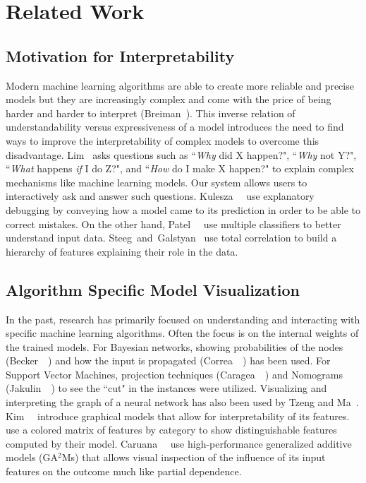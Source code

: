 
\section{Related Work}

\subsection{Motivation for Interpretability}
Modern machine learning algorithms are able to create more reliable and precise models
but they are increasingly complex and come with the price of being harder and harder to interpret (Breiman~\cite{breiman2001}).
This inverse relation of understandability versus expressiveness of a model introduces the need
to find ways to improve the interpretability of complex models to overcome this disadvantage.
Lim~\cite{Lim:2012:IUT:2518922} asks questions such as ``\emph{Why} did X happen?",
``\emph{Why} not Y?", ``\emph{What} happens \emph{if} I do Z?", and ``\emph{How} do I make X happen?"
to explain complex mechanisms like machine learning models.
Our system allows users to interactively ask and answer such questions.
Kulesza~\etal~\cite{Kulesza:2015:PED:2678025.2701399} use explanatory debugging by conveying how a model
came to its prediction in order to be able to correct mistakes.
On the other hand, Patel~\etal~\cite{DBLP:conf/ijcai/PatelDFKT11} use multiple classifiers
to better understand input data.
Steeg~and~Galstyan~\cite{NIPS2014_5580,steeg2015corex_theory} use total correlation to build
a hierarchy of features explaining their role in the data.

\subsection{Algorithm Specific Model Visualization}
In the past, research has primarily focused on understanding and interacting with specific machine learning algorithms.
Often the focus is on the internal weights of the trained models.
For Bayesian networks, showing probabilities of the nodes (Becker~\etal~\cite{Becker:2001:VSB:383784.383809}) and how the input is propagated (Correa~\etal~\cite{DBLP:journals/isci/MartinsONHC13})
has been used.
For Support Vector Machines,
projection techniques (Caragea~\etal~\cite{Caragea2001}) and
Nomograms (Jakulin~\etal~\cite{Jakulin:2005:NVS:1081870.1081886})
to see the ``cut" in the instances were utilized.
Visualizing and interpreting the graph of a neural network has also been used by Tzeng and Ma~\cite{Tzeng:2005:OTB}.
Kim~\etal~\cite{kim2014bayesian,kim2015MGM} introduce graphical models that allow for
interpretability of its features.
\cite{kim2015MGM} use a colored matrix of features by category to show distinguishable features computed by their model.
Caruana~\etal~\cite{Caruana:2015:IMH:2783258.2788613} use high-performance generalized additive models (GA$^2$Ms) that allows visual inspection of the influence of its input features on the outcome much like partial dependence.

